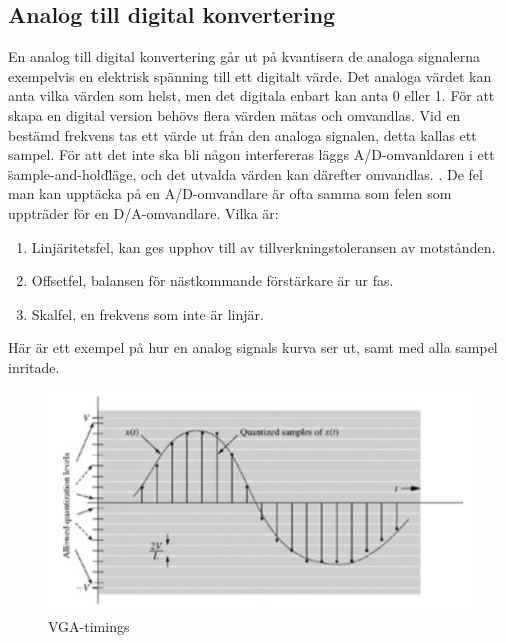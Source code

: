 \subsection{Analog till digital konvertering}
	En analog till digital konvertering går ut på kvantisera de analoga signalerna exempelvis en elektrisk spänning till ett digitalt värde. Det analoga värdet kan anta vilka värden som helst, men det digitala enbart kan anta 0 eller 1. För att skapa en digital version behövs flera värden mätas och omvandlas. Vid en bestämd frekvens tas ett värde ut från den analoga signalen, detta kallas ett sampel. För att det inte ska bli någon interfereras läggs A/D-omvanldaren i ett \"sample-and-hold\" läge, och det utvalda värden kan därefter omvandlas. \cite{analogsite}.
	De fel man kan upptäcka på en A/D-omvandlare är ofta samma som felen som uppträder för en D/A-omvandlare. Vilka är:
	\begin{enumerate}
		\item Linjäritetsfel, kan ges upphov till av tillverkningstoleransen av motstånden.
		\item Offsetfel, balansen för nästkommande förstärkare är ur fas.
		\item Skalfel, en frekvens som inte är linjär.
	\end{enumerate}
	\cite{tsea82_2014}

	Här är ett exempel på hur en analog signals kurva ser ut, samt med alla sampel inritade.

	\begin{center}
		\begin{figure}[H]
    		\centering
			\includegraphics[scale=0.50]{../grafik/adc.png}
			\caption{VGA-timings \cite{adcpic}}
			\label{fig:adcteori}
		\end{figure}
	\end{center}
